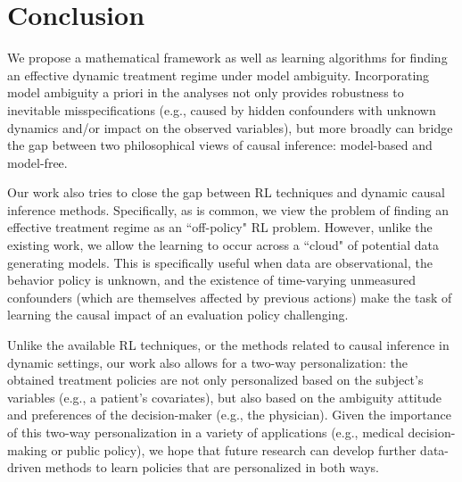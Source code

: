 \documentclass[opre,nonblindrev]{informs2}%
\newcommand{\1}{\hbox{\rm 1\kern-.35em 1}}
\begin{document}
\section{Conclusion}\label{sec:conclude}
We propose a mathematical framework as well as learning algorithms for finding an effective dynamic treatment regime under model ambiguity.  Incorporating model ambiguity a priori in the analyses not only provides robustness to inevitable misspecifications (e.g., caused by hidden confounders with unknown dynamics and/or  impact on the observed variables), but more broadly can bridge the gap between two philosophical views of causal inference: model-based and model-free.

Our work also tries to close the gap between RL techniques and dynamic causal inference methods.  Specifically, as is common, we view the problem of finding an effective treatment regime as an ``off-policy" RL problem. However, unlike the existing work, we allow the learning to occur across a ``cloud" of potential data generating models. This is specifically useful when data are observational, the behavior policy is unknown, and the existence of time-varying unmeasured confounders (which are themselves affected by previous actions) make the task of learning the causal impact of an evaluation policy challenging.

Unlike the available RL techniques, or the methods related to causal inference in dynamic settings, our work also allows for a two-way personalization: the obtained treatment policies are not only personalized based on the subject's variables (e.g., a patient's covariates), but also based on the ambiguity attitude and preferences of the decision-maker (e.g., the physician). Given the importance of this two-way personalization in a variety of applications (e.g., medical decision-making or public policy), we hope that future research can develop further data-driven methods to learn policies that are personalized in both ways.
\end{document}
